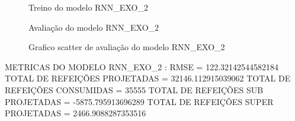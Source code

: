 \documentclass[	12pt, Times, openright, twoside, a4paper, english, brazil]{abntex2}
\begin{document}
                \begin{figure}[!ht]
                  \caption{Treino do modelo RNN\_EXO\_2 \label{fig:case1_rnn_exo_2_train} }
                \end{figure}

                \begin{figure}[!ht]
                  \caption{Avaliação do modelo RNN\_EXO\_2 \label{fig:case1_rnn_exo_2_val} }
                \end{figure}
                \begin{figure}[!ht]
                  \caption{Grafico scatter de avaliação do modelo RNN\_EXO\_2 \label{fig:case1_rnn_exo_2_val_scatter} }
                \end{figure}
                METRICAS DO MODELO RNN\_EXO\_2 : \newline
                RMSE = 122.32142544582184\newline
                TOTAL DE REFEIÇÕES PROJETADAS = 32146.112915039062\newline
                TOTAL DE REFEIÇÕES CONSUMIDAS = 35555\newline
                TOTAL DE REFEIÇÕES SUB PROJETADAS = -5875.795913696289\newline
                TOTAL DE REFEIÇÕES SUPER PROJETADAS = 2466.9088287353516\newline
\end{document}
